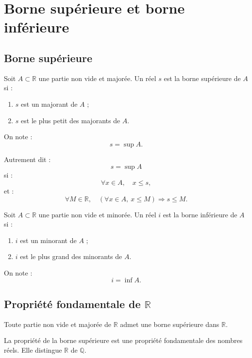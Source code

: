 \documentclass[11pt,a4paper]{article}
\newcommand{\Q}{\mathbb Q}
\newcommand{\R}{\mathbb R}
\newcommand{\implique}{\Longrightarrow}
\begin{document}
\section{Borne supérieure et borne inférieure}

\subsection{Borne supérieure}

\begin{definitionbox}
Soit \(A\subset\R\) une partie non vide et majorée.  
Un réel \(s\) est la borne supérieure de \(A\) si :
\begin{enumerate}
    \item \(s\) est un majorant de \(A\) ;
    \item \(s\) est le plus petit des majorants de \(A\).
\end{enumerate}
On note :
\[
s=\sup A.
\]
\end{definitionbox}

Autrement dit :
\[
s=\sup A
\]
si :
\[
\forall x\in A,\quad x\leq s,
\]
et :
\[
\forall M\in\R,\quad
\left(\forall x\in A,\ x\leq M\right)\implique s\leq M.
\]

\begin{definitionbox}
Soit \(A\subset\R\) une partie non vide et minorée.  
Un réel \(i\) est la borne inférieure de \(A\) si :
\begin{enumerate}
    \item \(i\) est un minorant de \(A\) ;
    \item \(i\) est le plus grand des minorants de \(A\).
\end{enumerate}
On note :
\[
i=\inf A.
\]
\end{definitionbox}

\subsection{Propriété fondamentale de \(\R\)}

\begin{theorembox}
Toute partie non vide et majorée de \(\R\) admet une borne supérieure dans \(\R\).
\end{theorembox}

\begin{retenirbox}
La propriété de la borne supérieure est une propriété fondamentale des nombres réels.  
Elle distingue \(\R\) de \(\Q\).
\end{retenirbox}
\end{document}
